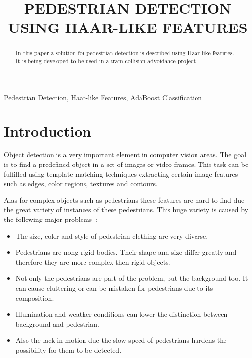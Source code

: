 \documentclass{article}
\title{PEDESTRIAN DETECTION USING HAAR-LIKE FEATURES}
\begin{document}
%
\maketitle
%
\begin{abstract}
In this paper a solution for pedestrian detection is described using Haar-like features. It is being developed to be used in a tram collision advoidance project. 
\end{abstract}
%
\begin{keywords}
Pedestrian Detection, Haar-like Features, AdaBoost Classification
\end{keywords}
%
\section{Introduction}
\label{sec:intro}

Object detection is a very important element in computer vision areas. The goal is to find a predefined object in a set of images or video frames. This task can be fulfilled using template matching techniques extracting certain image features such as edges, color regions, textures and contours.
\par
Alas for complex objects such as pedestrians these features are hard to find due the great variety of instances of these pedestrians. This huge variety is caused by the following major problems~\cite{monteiro2006vision}:

\begin{itemize}
\item The size, color and style of pedestrian clothing are very diverse.
\item Pedestrians are nong-rigid bodies. Their shape and size differ greatly and therefore they are more complex then rigid objects.
\item Not only the pedestrians are part of the problem, but the background too. It can cause cluttering or can be mistaken for pedestrians due to its composition.
\item Illumination and weather conditions can lower the distinction between background and pedestrian.
\item Also the lack in motion due the slow speed of pedestrians hardens the possibility for them to be detected.
\end{itemize}
\end{document}
